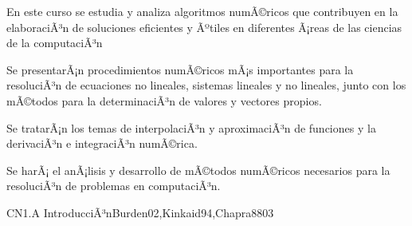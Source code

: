 
\begin{syllabus}


\begin{justification}
En este curso se estudia y analiza algoritmos numÃ©ricos que
contribuyen en la elaboraciÃ³n de soluciones eficientes y Ãºtiles en
diferentes Ã¡reas de las ciencias de la computaciÃ³n
\end{justification}

\begin{goals}
\item Se presentarÃ¡n procedimientos numÃ©ricos mÃ¡s importantes para la resoluciÃ³n de 
ecuaciones no lineales, sistemas lineales y no lineales, junto con los mÃ©todos 
para la determinaciÃ³n de valores y vectores propios.

\item Se tratarÃ¡n los temas de interpolaciÃ³n y aproximaciÃ³n de funciones y la 
derivaciÃ³n e integraciÃ³n numÃ©rica.

\item Se harÃ¡ el anÃ¡lisis y desarrollo de mÃ©todos numÃ©ricos necesarios para la 
resoluciÃ³n de problemas en computaciÃ³n.
\end{goals}

\begin{outcomes}
\end{outcomes}

\begin{unit}{CN1.A IntroducciÃ³n}{Burden02,Kinkaid94,Chapra88}{0}{3}
\begin{topics}
      \item \CNONETopicFloating
      \item \CNONETopicError
      \item \CNONETopicTaylor
   \end{topics}

   \begin{unitgoals}
      \item \CNONEObjONE
      \item \CNONEObjTWO
      \item \CNONEObjTHREE
      \item \CNONEObjFOUR
   \end{unitgoals}
\end{unit}


\end{syllabus}
